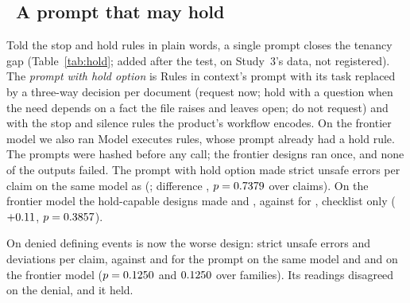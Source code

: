 \subsection{\dag\ A prompt that may hold}
\label{sec:test-hold-prompt}

Told the stop and hold rules in plain words, a single prompt closes the tenancy gap (Table~\ref{tab:hold}; added after the test, on Study~3's data, not registered). The \emph{prompt with hold option} is Rules in context's prompt with its task replaced by a three-way decision per document (request now; hold with a question when the need depends on a fact the file raises and leaves open; do not request) and with the stop and silence rules the product's workflow encodes. On the frontier model we also ran Model executes rules, whose prompt already had a hold rule. The prompts were hashed before any call; the frontier designs ran once, and none of the \sbcOutputs{} outputs failed. The prompt with hold option made \sbcHoldPromptAllStrict{} strict unsafe errors per claim on the same model as \casepath (\sbcCasePathAllStrict; difference \sbcCCasePathVsHoldPromptAllStrictDiff, $p=0.7379$ over claims). On the frontier model the hold-capable designs made \sbcHoldPromptFrontierAllStrict{} and \sbcMerHoldFrontierAllStrict, against \sbcFrontierChecklistAllStrict{} for \casepath, checklist only ($+0.11$, $p=0.3857$).

On denied defining events \casepath is now the worse design: \sbcCasePathODeniedStrict{} strict unsafe errors and \sbcCasePathODeniedAllDev{} deviations per claim, against \sbcHoldPromptODeniedStrict{} and \sbcHoldPromptODeniedAllDev{} for the prompt on the same model and \sbcHoldPromptFrontierODeniedStrict{} and \sbcHoldPromptFrontierODeniedAllDev{} on the frontier model ($p=0.1250$ and $0.1250$ over families). Its readings disagreed on the denial, and it held.

